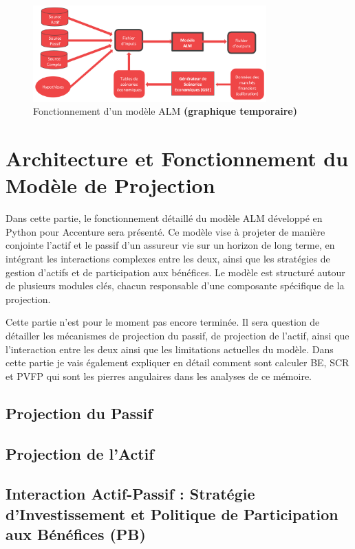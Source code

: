 \begin{figure}[H]
    \centering
    \includegraphics[width=0.8\textwidth]{images/2_chapitres/chapitre2/alm_det.png}
    \caption{Fonctionnement d'un modèle ALM \textbf{(graphique temporaire)}}
    \label{fig:alm_det}
\end{figure}



\section{Architecture et Fonctionnement du Modèle de Projection}
Dans cette partie, le fonctionnement détaillé du modèle ALM développé en Python pour Accenture sera présenté. Ce modèle vise à projeter de manière conjointe l'actif et le passif d'un assureur vie sur un horizon de long terme, en intégrant les interactions complexes entre les deux, ainsi que les stratégies de gestion d'actifs et de participation aux bénéfices. Le modèle est structuré autour de plusieurs modules clés, chacun responsable d'une composante spécifique de la projection.

Cette partie n'est pour le moment pas encore terminée. Il sera question de détailler les mécanismes de projection du passif, de projection de l'actif, ainsi que l'interaction entre les deux ainsi que les limitations actuelles du modèle. Dans cette partie je vais également expliquer en détail comment sont calculer BE, SCR et PVFP qui sont les pierres angulaires dans les analyses de ce mémoire.

    \subsection{Projection du Passif}
    \subsection{Projection de l'Actif}
    \subsection{Interaction Actif-Passif : Stratégie d'Investissement et Politique de Participation aux Bénéfices (PB)}

